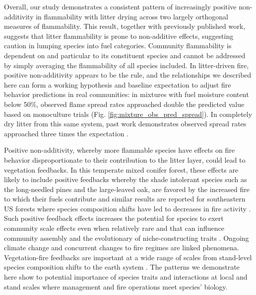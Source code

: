 \documentclass[letterpaper,12pt]{article}
\begin{document}
Overall, our study demonstrates a consistent pattern of increasingly positive
non-additivity in flammability with litter drying across two largely orthogonal
measures of flammability. This result, together with previously published work,
suggests that litter flammability is prone to non-additive effects, suggesting
caution in lumping species into fuel categories. Community flammability is
dependent on and particular to its constituent species and cannot be addressed
by simply averaging the flammability of all species included. In litter-driven
fire, positive non-additivity appears to be the rule, and the relationships we
described here can form a working hypothesis and baseline expectation to adjust
fire behavior predictions in real communities: in mixtures with fuel moisture
content below 50\%, observed flame spread rates approached double the predicted
value based on monoculture trials (Fig. \ref{fig:mixture_obs_pred_spread}). In
completely dry litter from this same system, past work demonstrates observed
spread rates approached three times the expectation
\citep{Magalhaes+Schwilk-2012}.

Positive non-additivity, whereby more flammable species have effects on fire
behavior disproportionate to their contribution to the litter layer, could lead
to vegetation feedbacks. In this temperate mixed conifer forest, these effects
are likely to include positive feedbacks whereby the shade intolerant species
such as the long-needled pines and the large-leaved oak, are favored by the
increased fire to which their fuels contribute \citep{Schwilk+Caprio-2011} and
similar results are reported for southeastern US forests where species
composition shifts have led to decreases in fire activity
\citep{Nowacki+Abrams-2008}. Such positive feedback effects increases the
potential for species to exert community scale effects even when relatively
rare and that can influence community assembly and the evolutionary of
niche-constructing traits \citep{Kerr+Schwilk+etal-1999, Schwilk+Kerr-2002}.
Ongoing climate change and concurrent changes to fire regimes are linked
phenomena. Vegetation-fire feedbacks are important at a wide range of scales
from stand-level species composition shifts to the earth system
\citep{Harris+Remenyi+etal-2016, Archibald+Lehmann+etal-2018}. The patterns we
demonstrate here show to potential importance of species traits and
interactions at local and stand scales where management and fire operations
meet species' biology.


\end{document}

